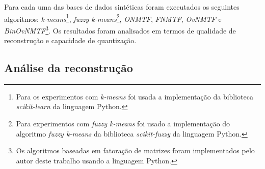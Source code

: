 \documentclass[
    12pt,                %
    oneside,            %
    a4paper,            %
    english,            %
    brazil                %
    ]{abntex2ppgsi}
\begin{document}


Para cada uma das bases de dados sintéticas foram executados os seguintes algoritmos: \textit{k-means}\footnote{Para os experimentos com \textit{k-means} foi usada a implementação da biblioteca \textit{scikit-learn} \cite{scikitLearn} da linguagem Python.}, \textit{fuzzy k-means}\footnote{Para experimentos com \textit{fuzzy k-means} foi usado a implementação do algoritmo \textit{fuzzy k-means} da biblioteca \textit{scikit-fuzzy} da linguagem Python.}, \textit{ONMTF}, \textit{FNMTF}, \textit{OvNMTF} e \textit{BinOvNMTF}\footnote{Os algoritmos baseadas em fatoração de matrizes foram implementados pelo autor deste trabalho usando a linguagem Python.}.
Os resultados foram analisados em termos de qualidade de reconstrução e capacidade de quantização.

\subsection{Análise da reconstrução}

\end{document}
